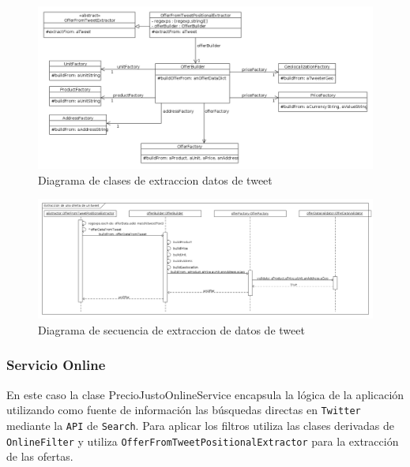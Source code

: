 \begin{figure}[h]
\centerline{\includegraphics[width=\textwidth]{./imgs/class_diagram_parsing.png}}
\caption{Diagrama de clases de extraccion datos de tweet}
\label{fig:class_parsing}
\end{figure}

\begin{figure}[h]
\centerline{\includegraphics[width=\textwidth]{./imgs/sequence_diagram_parsing.png}}
\caption{Diagrama de secuencia de extraccion de datos de tweet}
\label{fig:secuence_parsing}
\end{figure}

\subsubsection{Servicio Online}
En este caso la clase PrecioJustoOnlineService encapsula la lógica de la aplicación utilizando como fuente de información las búsquedas directas en \texttt{Twitter} mediante la \texttt{API} de \texttt{Search}.
Para aplicar los filtros utiliza las clases derivadas de \texttt{OnlineFilter} y utiliza \texttt{OfferFromTweetPositionalExtractor} para la extracción de las ofertas.

